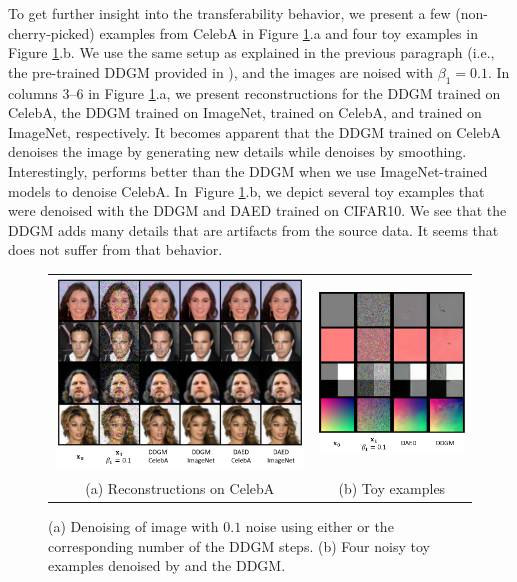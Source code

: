 To get further insight into the transferability behavior, we present a few (non-cherry-picked) examples from CelebA in Figure \ref{fig:transferability}.a and four toy examples in Figure \ref{fig:transferability}.b. We use the same setup as explained in the previous paragraph (i.e., the pre-trained DDGM provided in \cite{nichol2021improved}), and the images are noised with $\beta_1=0.1$. In columns 3--6 in Figure \ref{fig:transferability}.a, we present reconstructions for the DDGM trained on CelebA, the DDGM trained on ImageNet, \ours{} trained on CelebA, and \ours{} trained on ImageNet, respectively. It becomes apparent that the DDGM trained on CelebA denoises the image by generating new details while \ours{} denoises by smoothing. 
Interestingly, \ours{} performs better than the DDGM when we use ImageNet-trained models to denoise CelebA.
In~Figure \ref{fig:transferability}.b, we depict several toy examples that were denoised with the DDGM and DAED trained on CIFAR10. We see that the DDGM adds many details that are artifacts from the source data. It seems that \ours{} does not suffer from that behavior.

\begin{figure}[t]
	\centering
	\begin{tabular}{cc}
	   \includegraphics[width=0.56\linewidth, valign=c]{pics/4_daed/experiments/portability.png} & \includegraphics[width=0.38\linewidth, valign=c]{pics/4_daed/experiments/toy_example.png} \\
	    (a) Reconstructions on CelebA & (b) Toy examples
	\end{tabular}
	\caption{(a) Denoising of image with $0.1$ noise using either \ours{} or the corresponding number of the DDGM steps. (b) Four noisy toy examples denoised by \ours{} and the DDGM.}
	\label{fig:transferability}
\end{figure}
